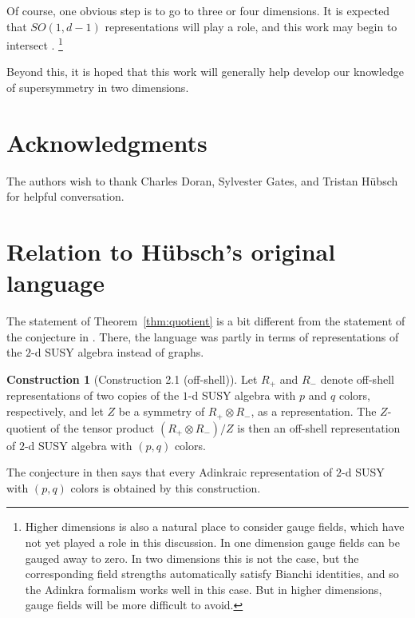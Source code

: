 \documentclass[12pt,twoside,singlespace]{article}
\numberwithin{equation}{section}
\theoremstyle{definition}
\newtheorem{construction}[equation]{Construction}
\begin{document}
Of course, one obvious step is to go to three or four dimensions.  It is expected that $SO(1,d-1)$ representations will play a role, and this work may begin to intersect \cite{faux:dimensional_enhancement,faux:spin_holography}.
\footnote{Higher dimensions is also a natural place to consider gauge fields, which have not yet played a role in this discussion.  In one dimension gauge fields can be gauged away to zero.  In two dimensions this is not the case, but the corresponding field strengths automatically satisfy Bianchi identities, and so the Adinkra formalism works well in this case.  But in higher dimensions, gauge fields will be more difficult to avoid.}

Beyond this, it is hoped that this work will generally help develop our knowledge of supersymmetry in two dimensions.

\section*{Acknowledgments}
The authors wish to thank Charles Doran, Sylvester Gates, and Tristan H\"ubsch for helpful conversation.

\appendix

\section{Relation to H\"ubsch's original language}
\label{app:repn}
The statement of Theorem~\ref{thm:quotient} is a bit different from the statement of the conjecture in \cite{hubsch:weaving}.  There, the language was partly in terms of representations of the $2$-d SUSY algebra instead of graphs.
\begin{construction}[Construction 2.1 (off-shell)] Let $R_+$ and $R_-$ denote off-shell representations of two copies of the $1$-d SUSY algebra with $p$ and $q$ colors, respectively, and let $Z$ be a symmetry of $R_+ \otimes R_-$, as a representation. The $Z$-quotient of the tensor product $(R_+ \otimes R_-)/Z$ is then an off-shell representation of $2$-d SUSY algebra with $(p,q)$ colors.
\end{construction}
The conjecture in \cite{hubsch:weaving} then says that every Adinkraic representation of $2$-d SUSY with $(p,q)$ colors is obtained by this construction.
\end{document}
